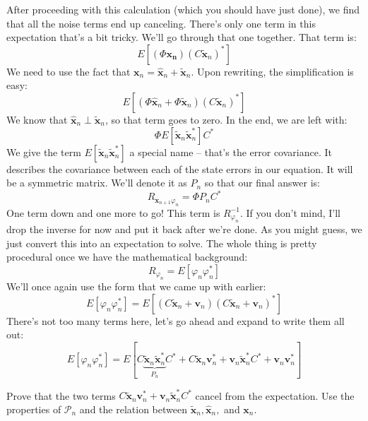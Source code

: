 After proceeding with this calculation (which you should have just done), we find that all the noise terms end up canceling. There's only one term in this expectation that's a bit tricky. We'll go through that one together. That term is:
$$E[(\Phi\bm{x_n})(C\bm{\tilde{x}}_n)^*]$$
We need to use the fact that $\bm{x}_n=\bm{\hat{x}}_n+\bm{\tilde{x}}_n$. Upon rewriting, the simplification is easy:
$$E[(\Phi\bm{\hat{x}}_n+\Phi\bm{\tilde{x}}_n)(C\bm{\tilde{x}}_n)^*]$$
We know that $\bm{\hat{x}}_n \perp \bm{\tilde{x}}_n$, so that term goes to zero. In the end, we are left with:
$$\Phi E[\bm{\tilde{x}}_n\bm{\tilde{x}}_n^*]C^*$$
We give the term $E[\bm{\tilde{x}}_n\bm{\tilde{x}}_n^*]$ a special name -- that's the error covariance. It describes the covariance between each of the state errors in our equation. It will be a symmetric matrix. We'll denote it as $P_n$ so that our final answer is:
$$R_{\bm{x}_{n+1} \varphi_n}=\Phi P_nC^*$$
One term down and one more to go! This term is $R_{\varphi_n}^{-1}$. If you don't mind, I'll drop the inverse for now and put it back after we're done. As you might guess, we just convert this into an expectation to solve. The whole thing is pretty procedural once we have the mathematical background:
$$R_{\varphi_n}=E[\varphi_n\varphi_n^*]$$
We'll once again use the form that we came up with earlier:
$$E[\varphi_n\varphi_n^*]=E[(C\bm{\tilde{x}}_n+\bm{v}_n)(C\bm{\tilde{x}}_n+\bm{v}_n)^*]$$
There's not too many terms here, let's go ahead and expand to write them all out:
$$E[\varphi_n\varphi_n^*]=E[C\underbrace{\bm{\tilde{x}}_n\bm{\tilde{x}}_n^*}_{P_n}C^*+C\bm{\tilde{x}}_n\bm{v}_n^*+\bm{v}_n\bm{\tilde{x}}_n^*C^*+\bm{v}_n\bm{v}_n^*]$$
\begin{exercise}
Prove that the two terms $C\bm{\tilde{x}}_n\bm{v}_n^*+\bm{v}_n\bm{\tilde{x}}_n^*C^*$ cancel from the expectation. Use the properties of $\mathcal{P}_n$ and the relation between $\bm{\tilde{x}}_n, \bm{\hat{x}}_n,$ and $\bm{{x}}_n$.
\end{exercise}

